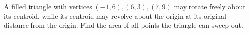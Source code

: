 A filled triangle with vertices $(-1,6),(6,3),(7,9)$ may rotate freely about its centroid, while its centroid may revolve about the origin at its original distance from the origin. Find the area of all points the triangle can sweep out.
